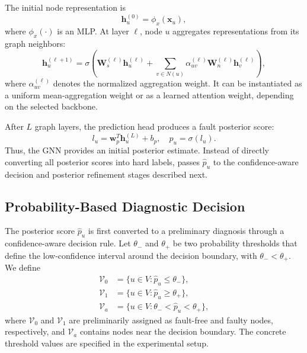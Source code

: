 The initial node representation is
\begin{equation*}
\mathbf{h}_u^{(0)}=\phi_x(\mathbf{x}_u),
\end{equation*}
where $\phi_x(\cdot)$ is an MLP. At layer $\ell$, node $u$ aggregates representations from its graph neighbors:
\begin{equation*}
\mathbf{h}_u^{(\ell+1)}=
\sigma\left(\mathbf{W}_{s}^{(\ell)}\mathbf{h}_u^{(\ell)}
+ \sum_{v\in N(u)} \alpha_{uv}^{(\ell)}
\mathbf{W}_{n}^{(\ell)}\mathbf{h}_v^{(\ell)}\right),
\end{equation*}
where $\alpha_{uv}^{(\ell)}$ denotes the normalized aggregation weight. It can be instantiated as a uniform mean-aggregation weight or as a learned attention weight, depending on the selected backbone.

After $L$ graph layers, the prediction head produces a fault posterior score:
\begin{equation*}
l_u=\mathbf{w}_{p}^{T}\mathbf{h}_u^{(L)}+b_p,\quad
\hat{p}_u=\sigma(l_u).
\end{equation*}
Thus, the GNN provides an initial posterior estimate. Instead of directly converting all posterior scores into hard labels, \tool passes $\hat{p}_u$ to the confidence-aware decision and posterior refinement stages described next.

\subsection{Probability-Based Diagnostic Decision}

The posterior score $\hat{p}_u$ is first converted to a preliminary diagnosis through a confidence-aware decision rule. Let $\theta_-$ and $\theta_+$ be two probability thresholds that define the low-confidence interval around the decision boundary, with $\theta_-<\theta_+$. We define
\begin{align*}
\mathcal{V}_{0} &= \{u\in V: \hat{p}_u\le \theta_-\},\\
\mathcal{V}_{1} &= \{u\in V: \hat{p}_u\ge \theta_+\},\\
\mathcal{V}_{a} &= \{u\in V: \theta_-<\hat{p}_u<\theta_+\},
\end{align*}
where $\mathcal{V}_{0}$ and $\mathcal{V}_{1}$ are preliminarily assigned as fault-free and faulty nodes, respectively, and $\mathcal{V}_{a}$ contains nodes near the decision boundary. The concrete threshold values are specified in the experimental setup.

